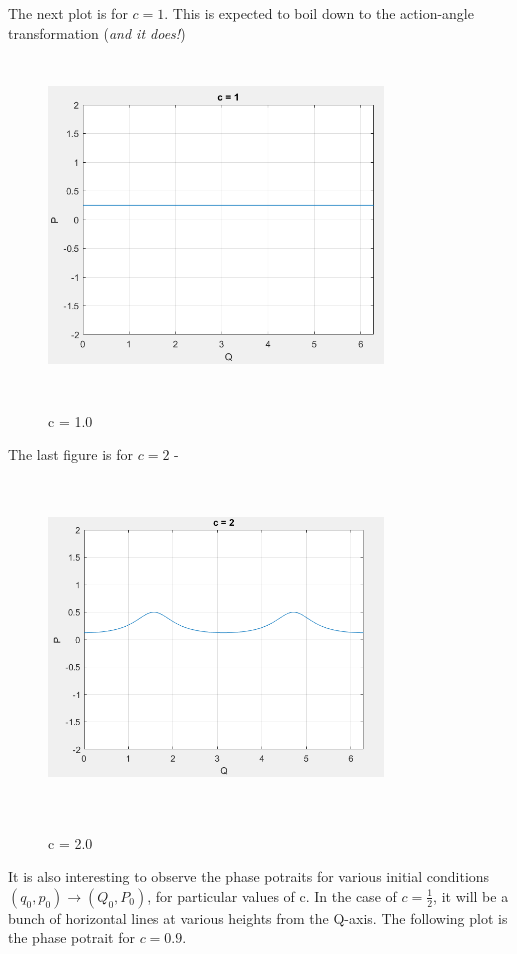 \documentclass{article}
\begin{document}
\justify
The next plot is for $c=1$. This is expected to boil down to the action-angle transformation (\textit{and it does!})
\begin{figure}[!htb]
    \centering
    \includegraphics[width=3.5in,height=3.5in,keepaspectratio]{C1.PNG}
    \label{fig:C1}
    \caption{c = 1.0}
\end{figure}
\justify
The last figure is for $c = 2$ -
\begin{figure}[!htb]
    \centering
    \includegraphics[width=3.5in,height=3.5in,keepaspectratio]{C2.PNG}
    \label{fig:C2}
    \caption{c = 2.0}
\end{figure}
\justify
It is also interesting to observe the phase potraits for various initial conditions $(q_0, p_0) \to (Q_0, P_0)$, for particular values of c. In the case of $c=\frac{1}{2}$, it will be a bunch of horizontal lines at various heights from the Q-axis. The following plot is the phase potrait for $c=0.9$. 
\end{document}
